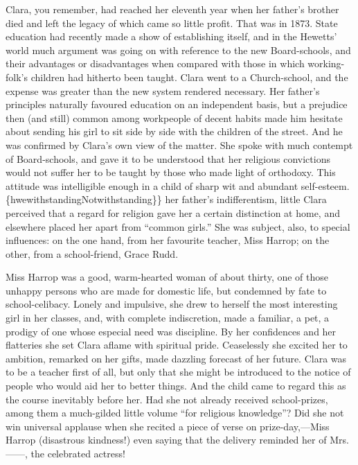 Clara, you remember, had reached her eleventh year when her father's
brother died {\protect\hypertarget{193}{}{}}and left the legacy of which
came so little profit. That was in 1873. State education had recently
made a show of establishing itself, and in the Hewetts' world much
argument was going on with reference to the new Board-schools, and their
advantages or disadvantages when compared with those in which
working-folk's children had hitherto been taught. Clara went to a
Church-school, and the expense was greater than the new system rendered
necessary. Her father's principles naturally favoured education on an
independent basis, but a prejudice then (and still) common among
workpeople of decent habits made him hesitate about sending his girl to
sit side by side with the children of the street. And he was confirmed
by Clara's own view of the matter. She spoke with much contempt of
Board-schools, and gave it to be understood that her religious
convictions would not suffer her to be taught by those who made light of
orthodoxy. This attitude was intelligible enough in a child of sharp wit
and abundant self-esteem.
{\protect\hypertarget{194}{}{}}\{hwe\textbar{}withstanding\textbar{}Notwithstanding\}\}
her father's indifferentism, little Clara perceived that a regard for
religion gave her a certain distinction at home, and elsewhere placed
her apart from ``common girls.'' She was subject, also, to special
influences: on the one hand, from her favourite teacher, Miss Harrop; on
the other, from a school-friend, Grace Rudd.

Miss Harrop was a good, warm-hearted woman of about thirty, one of those
unhappy persons who are made for domestic life, but condemned by fate to
school-celibacy. Lonely and impulsive, she drew to herself the most
interesting girl in her classes, and, with complete indiscretion, made a
familiar, a pet, a prodigy of one whose especial need was discipline. By
her confidences and her flatteries she set Clara aflame with spiritual
pride. Ceaselessly she excited her to ambition, remarked on her gifts,
made dazzling forecast of her future. Clara was to be a teacher first of
all, but only that she might be introduced to the notice of people who
would aid her to better things. And the
{\protect\hypertarget{195}{}{}}child came to regard this as the course
inevitably before her. Had she not already received school-prizes, among
them a much-gilded little volume ``for religious knowledge''? Did she
not win universal applause when she recited a piece of verse on
prize-day,---Miss Harrop (disastrous kindness!) even saying that the
delivery reminded her of Mrs. {{------}}, the celebrated actress!

